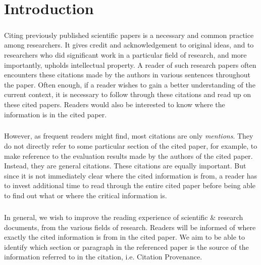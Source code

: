 \chapter{Introduction}
\label{introduction}
\paragraph{}
Citing previously published scientific papers is a necessary and common practice among researchers. It gives credit and acknowledgement to original ideas, and to researchers who did significant work in a particular field of research, and more importantly, upholds intellectual property. A reader of such research papers often encounters these citations made by the authors in various sentences throughout the paper. Often enough, if a reader wishes to gain a better understanding of the current context, it is necessary to follow through these citations and read up on these cited papers. Readers would also be interested to know where the information is in the cited paper.

\paragraph{}
However, as frequent readers might find, most citations are only \textit{mentions}. They do not directly refer to some particular section of the cited paper, for example, to make reference to the evaluation results made by the authors of the cited paper. Instead, they are general citations. These citations are equally important. But since it is not immediately clear where the cited information is from, a reader has to invest additional time to read through the entire cited paper before being able to find out what or where the critical information is.

\paragraph{}
In general, we wish to improve the reading experience of scientific \& research documents, from the various fields of research. Readers will be informed of where exactly the cited information is from in the cited paper. We aim to be able to identify which section or paragraph in the referenced paper is the source of the information referred to in the citation, i.e. Citation Provenance.

 
